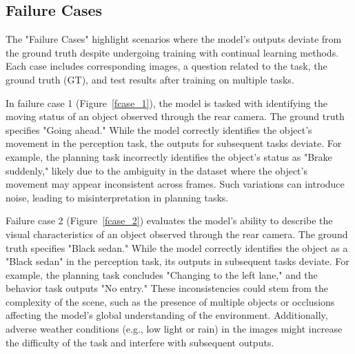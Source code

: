 
\subsection{Failure Cases}
The "Failure Cases" highlight scenarios where the model's outputs deviate from the ground truth despite undergoing training with continual learning methods. Each case includes corresponding images, a question related to the task, the ground truth (GT), and test results after training on multiple tasks. 

In failure case 1 (Figure~\ref{fcase_1}), the model is tasked with identifying the moving status of an object observed through the rear camera. The ground truth specifies "Going ahead." While the model correctly identifies the object's movement in the perception task, the outputs for subsequent tasks deviate. For example, the planning task incorrectly identifies the object's status as "Brake suddenly," likely due to the ambiguity in the dataset where the object's movement may appear inconsistent across frames. Such variations can introduce noise, leading to misinterpretation in planning tasks.

Failure case 2 (Figure~\ref{fcase_2}) evaluates the model’s ability to describe the visual characteristics of an object observed through the rear camera. The ground truth specifies "Black sedan." While the model correctly identifies the object as a "Black sedan" in the perception task, its outputs in subsequent tasks deviate. For example, the planning task concludes "Changing to the left lane," and the behavior task outputs "No entry." These inconsistencies could stem from the complexity of the scene, such as the presence of multiple objects or occlusions affecting the model's global understanding of the environment. Additionally, adverse weather conditions (e.g., low light or rain) in the images might increase the difficulty of the task and interfere with subsequent outputs.


